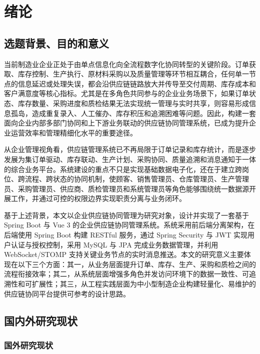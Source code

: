 \chapter{绪论}

\section{选题背景、目的和意义}

当前制造业企业正处于由单点信息化向全流程数字化协同转型的关键阶段。订单获取、库存控制、生产执行、原材料采购以及质量管理等环节相互耦合，任何单一节点的信息延迟或处理失误，都会沿供应链链路放大并传导至交付周期、库存成本和客户满意度等核心指标。尤其是在多角色共同参与的企业业务场景下，如果订单状态、库存数量、采购进度和质检结果无法实现统一管理与实时共享，则容易形成信息孤岛，造成重复录入、人工催办、库存积压和追溯困难等问题。因此，构建一套面向企业内部多部门协同和上下游业务联动的供应链协同管理系统，已成为提升企业运营效率和管理精细化水平的重要途径\citep{christopher2016,lee2004triplea}。

从企业管理视角看，供应链管理系统已不再局限于订单记录和库存统计，而是逐步发展为集订单驱动、库存联动、生产计划、采购协同、质量追溯和消息通知于一体的综合业务平台。系统建设的重点不只是实现基础数据电子化，还在于建立跨岗位、跨流程、跨状态的协同机制，使顾客、销售管理员、仓库管理员、生产管理员、采购管理员、供应商、质检管理员和系统管理员等角色能够围绕统一数据源开展工作，并通过可控的权限边界实现职责分离与业务闭环\citep{gunasekaran2004framework,monk2012erp}。

基于上述背景，本文以企业供应链协同管理为研究对象，设计并实现了一套基于 Spring Boot 与 Vue 3 的企业供应链协同管理系统。系统采用前后端分离架构，在后端使用 Spring Boot 构建 RESTful 服务，通过 Spring Security 与 JWT 实现用户认证与授权控制，采用 MySQL 与 JPA 完成业务数据管理，并利用 WebSocket/STOMP 支持关键业务节点的实时消息推送。本文的研究意义主要体现在以下三个方面：其一，从业务层面提升订单、库存、生产、采购和质检之间的流程衔接效率；其二，从系统层面增强多角色并发访问环境下的数据一致性、可追溯性和可扩展性；其三，从工程实践层面为中小型制造企业构建轻量化、易维护的供应链协同平台提供可参考的设计思路。

\section{国内外研究现状}

\subsection{国外研究现状}


